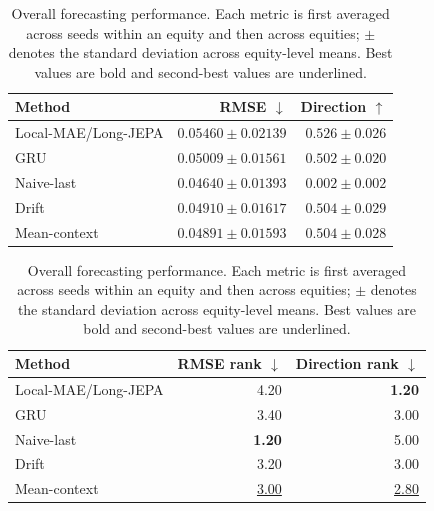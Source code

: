 \begin{table}[t]
\centering
\small
\caption{Overall forecasting performance. Each metric is first averaged across seeds within an equity and then across equities; $\pm$ denotes the standard deviation across equity-level means. Best values are bold and second-best values are underlined.}
\label{tab:main_metrics}
\begin{tabular}{lrr}
\toprule
Method & RMSE $\downarrow$ & Direction $\uparrow$ \\
\midrule
Local-MAE/Long-JEPA & $0.05460 \pm 0.02139$ & \textbf{$0.526 \pm 0.026$} \\
GRU & $0.05009 \pm 0.01561$ & $0.502 \pm 0.020$ \\
Naive-last & \textbf{$0.04640 \pm 0.01393$} & $0.002 \pm 0.002$ \\
Drift & $0.04910 \pm 0.01617$ & \underline{$0.504 \pm 0.029$} \\
Mean-context & \underline{$0.04891 \pm 0.01593$} & \underline{$0.504 \pm 0.028$} \\
\bottomrule
\end{tabular}
\par\medskip
\begin{tabular}{lrr}
\toprule
Method & RMSE rank $\downarrow$ & Direction rank $\downarrow$ \\
\midrule
Local-MAE/Long-JEPA & 4.20 & \textbf{1.20} \\
GRU & 3.40 & 3.00 \\
Naive-last & \textbf{1.20} & 5.00 \\
Drift & 3.20 & 3.00 \\
Mean-context & \underline{3.00} & \underline{2.80} \\
\bottomrule
\end{tabular}
\end{table}
